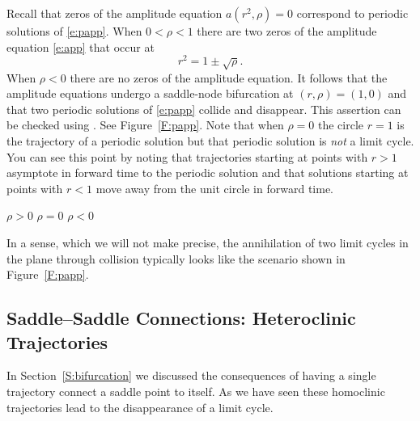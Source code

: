 \documentclass{ximera}
\begin{document}
Recall that zeros of the amplitude equation $a(r^2,\rho)=0$ correspond to 
periodic solutions of \eqref{e:papp}.  When $0<\rho<1$ there are two zeros of 
the amplitude equation \eqref{e:app} that occur at 
\[
r^2 = 1 \pm\sqrt{\rho}.
\]
When $\rho<0$ there are no zeros of the amplitude equation.  
It follows that the amplitude equations undergo a saddle-node 
bifurcation at $(r,\rho)=(1,0)$ and that two periodic solutions of 
\eqref{e:papp} collide and disappear.  This assertion can be 
checked using {\pplane}.  
See Figure~\ref{F:papp}. Note that when $\rho=0$
the circle $r=1$ is the trajectory of a periodic solution but that periodic 
solution is {\em not\/} a limit cycle.  You can see this point by noting that 
trajectories starting at points with $r>1$ asymptote in forward time to the 
periodic solution and that solutions starting at points with $r<1$ move away 
from the unit circle in forward time.  

\begin{figure*}[htb]
           \centerline{%
	   }
 	\vspace*{-0.2in}
	\hspace{0.3in} $\rho>0$  \hspace{1.9in} $\rho=0$
		\hspace{1.9in} $\rho<0$ 
           \caption{Phase portraits for \protect\eqref{e:papp}. 
Note that there are two limit cycles when $\rho>0$; one periodic solution 
when  $\rho=0$; and no periodic solutions when $\rho<0$.}
           \label{F:papp}
\end{figure*}

In a sense, which we will not make precise, the annihilation of two
limit cycles in the plane through collision typically looks like the 
scenario shown in Figure~\ref{F:papp}.  



\subsection*{Saddle--Saddle Connections: Heteroclinic Trajectories}

In Section~\ref{S:bifurcation} we discussed the consequences of having a 
single trajectory connect a saddle point to itself.  As we have seen these 
homoclinic trajectories lead to the disappearance of a limit cycle.
\end{document}
